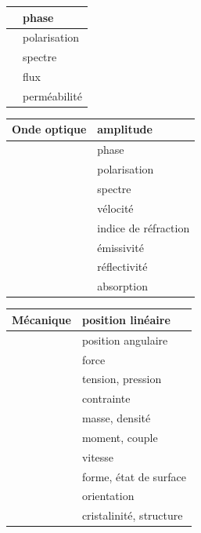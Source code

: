 \documentclass[main.tex]{subfiles}
\begin{document}
\begin {center}
\begin{tabular}{|p{3cm}|p{7cm}|}
    \hline
               & phase        \\
    \hline
               & polarisation \\
    \hline
               & spectre      \\
    \hline
               & flux         \\
    \hline
               & perméabilité \\
    \hline
\end{tabular}
\begin{tabular}{|p{3cm}|p{7cm}|}
    Onde optique & amplitude            \\
    \hline
                 & phase                \\
    \hline
                 & polarisation         \\
    \hline
                 & spectre              \\
    \hline
                 & vélocité             \\
    \hline
                 & indice de réfraction \\
    \hline
                 & émissivité           \\
    \hline
                 & réflectivité         \\
    \hline
                 & absorption           \\
    \hline
\end{tabular}
\begin{tabular}{|p{3cm}|p{7cm}|}
    Mécanique & position linéaire       \\
    \hline
              & position angulaire      \\
    \hline
              & force                   \\
    \hline
              & tension, pression       \\
    \hline
              & contrainte              \\
    \hline
              & masse, densité          \\
    \hline
              & moment, couple          \\
    \hline
              & vitesse                 \\
    \hline
              & forme, état de surface  \\
    \hline
              & orientation             \\
    \hline
              & cristalinité, structure \\
    \hline
\end{tabular}

\end{center}
\end{document}
